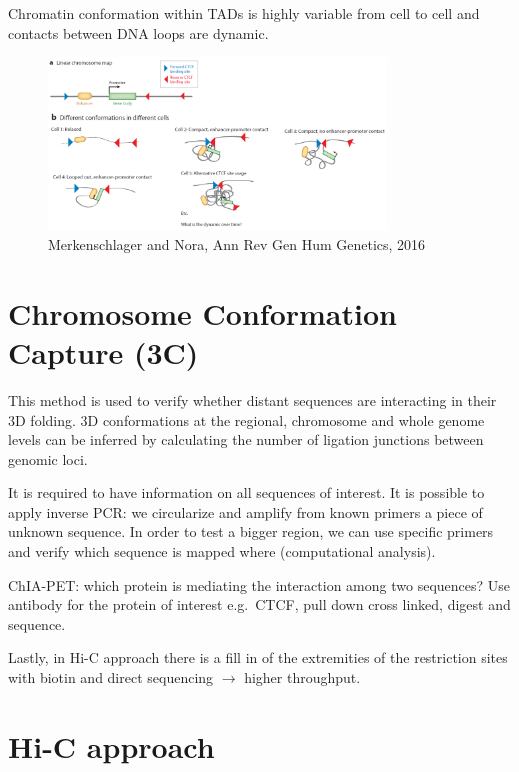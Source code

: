 Chromatin conformation within TADs is highly variable from cell to cell and contacts between DNA loops are dynamic.

\begin{figure}
\centering
\includegraphics[width=0.8\textwidth]{../_resources/Screenshot_2022-10-19_at_08-48-41.png}
\caption{Merkenschlager and Nora, Ann Rev Gen Hum Genetics, 2016}
\end{figure}

\hypertarget{chromosome-conformation-capture-3c}{%
\section{Chromosome Conformation Capture (3C)}\label{chromosome-conformation-capture-3c}}

This method is used to verify whether distant sequences are interacting in their 3D folding. 3D conformations at the regional, chromosome and whole genome levels can be inferred by calculating the number of ligation junctions between genomic loci.

It is required to have information on all sequences of interest. It is possible to apply inverse PCR: we circularize and amplify from known primers a piece of unknown sequence. In order to test a bigger region, we can use specific primers and verify which sequence is mapped where (computational analysis).

ChIA-PET: which protein is mediating the interaction among two sequences? Use antibody for the protein of interest e.g.~CTCF, pull down cross linked, digest and sequence.

Lastly, in Hi-C approach there is a fill in of the extremities of the restriction sites with biotin and direct sequencing $\rightarrow$ higher throughput.

\hypertarget{hi-c-approach}{%
\section{Hi-C approach}\label{hi-c-approach}}

